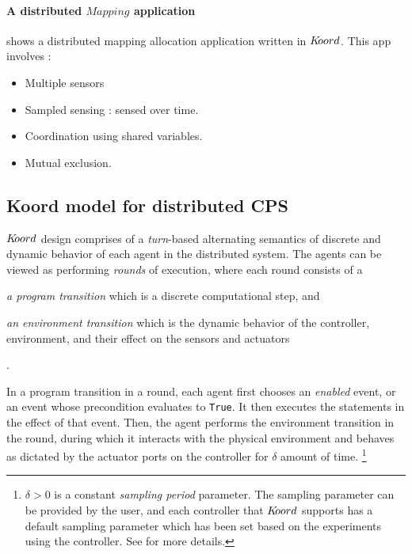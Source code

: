 \paragraph* {A distributed $\mathit{Mapping}$  application}  shows a distributed mapping allocation application written in $K\kern-2pt oord$. This app involves :
\begin{itemize}
    \item Multiple sensors
    \item Sampled sensing : sensed over time. 
    \item Coordination using shared variables. 
    \item Mutual exclusion. 
\end{itemize}

\subsection{Koord model for distributed CPS}

$K\kern-2pt oord$ design comprises of a \emph{turn}-based alternating semantics of discrete and dynamic behavior of each agent in the distributed system. The agents can be viewed as performing \emph{rounds} of execution, where each round consists of a \begin{inparaenum} 
\item \emph{a program transition} which is a discrete computational step, and 
\item \item \emph{an environment transition} which is the dynamic behavior of the controller, environment, and their effect on the sensors and actuators
\end{inparaenum}. 

In a program transition in a round, each agent first  chooses an \emph{enabled} event, or an event whose precondition evaluates to \verb|True|. It then executes the statements in the effect of that event. %
Then, the agent performs the environment transition in the round, during which it interacts with the physical environment and behaves as dictated by the actuator ports on the controller for $\delta$ amount of time.  \footnote{ $\delta>0$ is a constant \emph{sampling period} parameter. The sampling parameter can be provided by the user, and each controller that $K\kern-2pt oord$ supports has a default sampling parameter which has been set based on the experiments using the controller. See  for more details.}  %

